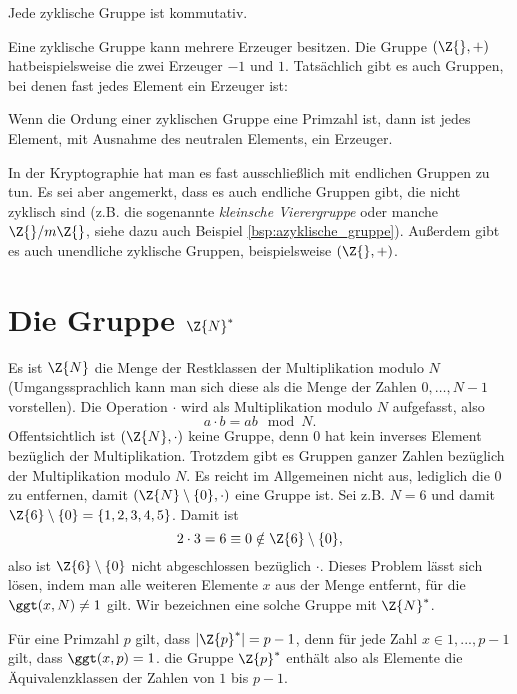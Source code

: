 \begin{theorem}
Jede zyklische Gruppe ist kommutativ.  
\end{theorem}

Eine zyklische Gruppe kann mehrere Erzeuger besitzen. Die Gruppe $(\Z{},
+)$ hatbeispielsweise die zwei Erzeuger $-1$ und $1$. Tatsächlich gibt es auch
Gruppen, bei denen fast jedes Element ein Erzeuger ist: 
\begin{theorem} 
Wenn die Ordung einer zyklischen Gruppe eine Primzahl ist, dann ist
jedes Element, mit Ausnahme des neutralen Elements, ein Erzeuger. 
\end{theorem}

In der Kryptographie hat man es fast ausschließlich mit endlichen
Gruppen zu tun. Es sei aber angemerkt, dass es auch endliche Gruppen
gibt, die nicht zyklisch sind (z.B. die sogenannte \emph{kleinsche
Vierergruppe} oder manche $\Z{}/m\Z{}$, siehe dazu auch Beispiel \ref{bsp:azyklische_gruppe}). Außerdem
gibt es auch unendliche zyklische Gruppen, beispielsweise $(\Z{},+)$.
\section{Die Gruppe $\Z{N}^*$}
Es ist $\Z{N}$ die Menge der Restklassen der Multiplikation modulo $N$
(Umgangssprachlich kann man sich diese als die Menge der Zahlen
${0,\dots , N-1}$ vorstellen). Die Operation $\cdot$ wird als
Multiplikation modulo $N$ aufgefasst, also 
\[
a \cdot b = ab \mod N.
\]
 Offentsichtlich
ist $(\Z{N}, \cdot)$ keine Gruppe, denn $0$ hat kein inverses Element
bezüglich der Multiplikation.
Trotzdem gibt es Gruppen ganzer Zahlen bezüglich der
Multiplikation modulo $N$. Es reicht im Allgemeinen nicht aus, lediglich die $0$ zu
entfernen, damit $(\Z{N}\setminus \{0\}, \cdot)$ eine Gruppe ist. Sei
z.B. $N=6$ und damit $\Z{6}\setminus \{0\} = \{1,2,3,4,5\}$. Damit ist  
\[
2 \cdot 3 = 6 \equiv 0 \notin \Z{6}\setminus \{0\},
\]
also ist $\Z{6}\setminus \{0\}$ nicht abgeschlossen bezüglich $\cdot$. 
Dieses Problem lässt sich lösen, indem man alle weiteren Elemente $x$ aus
der Menge entfernt, für die $\ggt(x, N)\neq 1$ gilt. Wir bezeichnen eine
solche Gruppe mit $\Z{N}^*$. 

Für eine Primzahl $p$ gilt, dass  $|\Z{p}^*|= p-1$, denn für jede Zahl $x\in
{1,..., p-1}$ gilt, dass $\ggt(x, p)=1$. die Gruppe $\Z{p}^*$ enthält
also als Elemente die Äquivalenzklassen der Zahlen von $1$ bis $p-1$.

